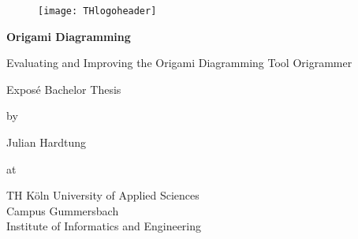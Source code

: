 
\begin{titlepage}
	\begin{center}
	
		\begin{figure}[!htbp]
			\texttt{[image: THlogoheader]}
		\end{figure}
		
		\vspace{0.8cm}
		
		\begin{rmfamily}
			\begin{huge}
				\textbf{Origami Diagramming}\\
			\end{huge}
			\vspace{0.5cm}
			\begin{LARGE}
				Evaluating and Improving the Origami Diagramming Tool Origrammer\\
			\end{LARGE}
		\end{rmfamily}
		
		\vspace{1.5cm}
		
		\begin{LARGE}
			\begin{scshape}
				Exposé Bachelor Thesis\\[0.8em]
			\end{scshape}
		\end{LARGE}
		
		\begin{large}
			by\\
			\begin{LARGE}
				Julian Hardtung\\
			\end{LARGE}
		\end{large}
		
		\vfill
		
		\begin{large}
			at\\
			\vspace{0.2cm}
			\begin{scshape}
				TH Köln University of Applied Sciences\\
				Campus Gummersbach\\
				Institute of Informatics and Engineering
			\end{scshape}
		\end{large}
		

\end{center}
\end{titlepage}
